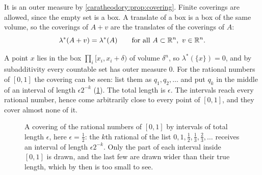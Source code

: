 \begin{notechapter}
It is an outer measure by \cref{caratheodory:prop:covering}. Finite
coverings are allowed, since the empty set is a box. A translate of a
box is a box of the same volume, so the coverings of $A + v$ are the
translates of the coverings of $A$:
\begin{equation}\label{caratheodory:eq:translation}
  \lambda^*(A + v) = \lambda^*(A)
  \qquad\text{for all }A\subset\mathbb{R}^n,\ v\in\mathbb{R}^n .
\end{equation}

\begin{example}\label{caratheodory:ex:rationals}
A point $x$ lies in the box $\prod_i[x_i, x_i + \delta)$ of volume
$\delta^n$, so $\lambda^*(\{x\}) = 0$, and by subadditivity every
countable set has outer measure $0$. For the rational numbers of
$[0, 1]$ the covering can be seen: list them as
$q_1, q_2, \dots$ and put $q_k$ in the middle of an interval of length
$\epsilon2^{-k}$ (\cref{caratheodory:fig:rationals}). The total length
is $\epsilon$. The intervals reach every rational number, hence come
arbitrarily close to every point of $[0, 1]$, and they cover almost
none of it.
\end{example}

\begin{figure}[ht]
\centering
{}
\caption{A covering of the rational numbers of $[0, 1]$ by intervals of
total length $\epsilon$, here $\epsilon = \frac12$: the $k$th rational
of the list $0, 1, \frac12, \frac13, \frac23, \dots$ receives an
interval of length $\epsilon2^{-k}$. Only the part of each interval
inside $[0, 1]$ is drawn, and the last few are drawn wider than their
true length, which by then is too small to see.}
\label{caratheodory:fig:rationals}
\end{figure}


\end{notechapter}
